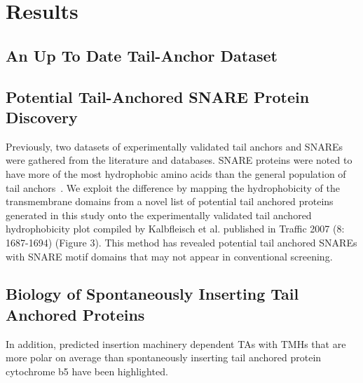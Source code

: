 \section{Results}

\subsection{An Up To Date Tail-Anchor Dataset}

\subsection{Potential Tail-Anchored SNARE Protein Discovery}
Previously, two datasets of experimentally validated tail anchors and SNAREs were gathered from the literature and databases.
SNARE proteins were noted to have more of the most hydrophobic amino acids than the general population of tail anchors~\cite{Kalbfleisch2007}.
We exploit the difference by mapping the hydrophobicity of the transmembrane domains from a novel list of potential tail anchored proteins generated in this study onto the experimentally validated tail anchored hydrophobicity plot compiled by Kalbfleisch et al. published in Traffic 2007 (8: 1687-1694) (Figure 3).
This method has revealed potential tail anchored SNAREs with SNARE motif domains that may not appear in conventional screening.

\subsection{Biology of Spontaneously Inserting Tail Anchored Proteins}
In addition, predicted insertion machinery dependent TAs with TMHs that are more polar on average than spontaneously inserting tail anchored protein cytochrome b5 have been highlighted.
